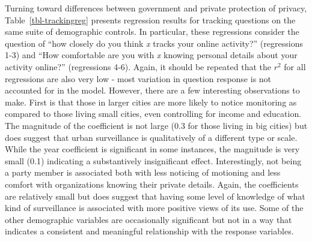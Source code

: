 \documentclass[
  letterpaper,
  DIV=11,
  numbers=noendperiod]{scrartcl}
\begin{document}
Turning toward differences between government and private protection of
privacy, Table~\ref{tbl-trackingreg} presents regression results for
tracking questions on the same suite of demographic controls. In
particular, these regressions consider the question of ``how closely do
you think \emph{x} tracks your online activity?'' (regressions 1-3) and
``How comfortable are you with \emph{x} knowing personal details about
your activity online?'' (regressions 4-6). Again, it should be repeated
that the \(r^2\) for all regressions are also very low - most variation
in question response is not accounted for in the model. However, there
are a few interesting observations to make. First is that those in
larger cities are more likely to notice monitoring as compared to those
living small cities, even controlling for income and education. The
magnitude of the coefficient is not large (0.3 for those living in big
cities) but does suggest that urban surveillance is qualitatively of a
different type or scale. While the year coefficient is significant in
some instances, the magnitude is very small (0.1) indicating a
substantively insignificant effect. Interestingly, not being a party
member is associated both with less noticing of motioning and less
comfort with organizations knowing their private details. Again, the
coefficients are relatively small but does suggest that having some
level of knowledge of what kind of surveillance is associated with more
positive views of its use. Some of the other demographic variables are
occasionally significant but not in a way that indicates a consistent
and meaningful relationship with the response variables.
\end{document}
